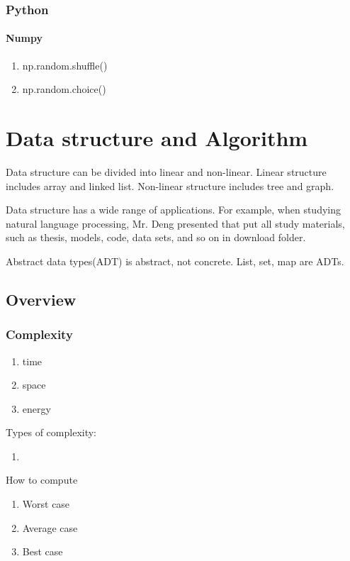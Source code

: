 \documentclass[12pt, a4paper]{report}
\begin{document}
     \subsection{Python}
     	\subsubsection{Numpy}
		\begin{enumerate}
			\item np.random.shuffle()
			\item np.random.choice()
		
		\end{enumerate}
	
        



\chapter{Data structure and Algorithm}
    Data structure can be divided into linear and non-linear. Linear structure includes array and linked list. Non-linear structure includes tree and graph. \par 
    Data structure has a wide range of applications. For example, when studying natural language processing, Mr. Deng presented that put all study materials, such as thesis, models, code, data sets, and so on in download folder.  \par 
    Abstract data types(ADT) is abstract, not concrete. List, set, map are ADTs. 
    \section{Overview}
        \subsection{Complexity}
        \begin{enumerate}
            \item time
            \item space 
            \item energy
        \end{enumerate}
        Types of complexity: 
        \begin{enumerate}
            \item 
        \end{enumerate}
        How to compute
        \begin{enumerate}
            \item Worst case
            \item Average case
            \item Best case 
        \end{enumerate}
    
\end{document}
